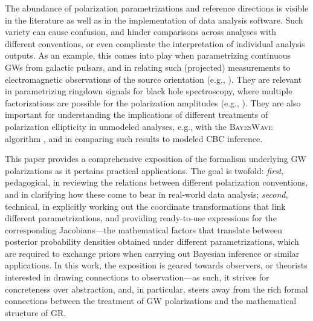 \documentclass[aps,prd,twocolumn,superscriptaddress,preprintnumbers,floatfix,nofootinbib]{revtex4-2}
\begin{document}
The abundance of polarization parametrizations and reference directions is visible in the literature as well as in the implementation of data analysis software.
Such variety can cause confusion, and hinder comparisons across analyses with different conventions, or even complicate the interpretation of individual analysis outputs.
As an example, this comes into play when parametrizing continuous GWs from galactic pulsars, and in relating such (projected) measurements to electromagnetic observations of the source orientation (e.g., \cite{Ng:2007te,Dupuis:2005xv,Isi:2017equ,Pitkin:2017qfy}).
They are relevant in parametrizing ringdown signals for black hole spectroscopy, where multiple factorizations are possible for the polarization amplitudes (e.g., \cite{Isi:2021iql,Carullo:2019flw,LIGOScientific:2020tif,LIGOScientific:2021sio}).
They are also important for understanding the implications of different treatments of polarization ellipticity in unmodeled analyses, e.g., with the \textsc{BayesWave} algorithm \cite{Cornish:2014kda,Cornish:2020dwh,Chatziioannou:2021mij}, and in comparing such results to modeled \ac{CBC} inference.

This paper provides a comprehensive exposition of the formalism underlying GW polarizations as it pertains practical applications.
The goal is twofold:
\emph{first}, pedagogical, in reviewing the relations between different polarization conventions, and in clarifying how these come to bear in real-world data analysis;
\emph{second}, technical, in explicitly working out the coordinate transformations that link different parametrizations, and providing ready-to-use expressions for the corresponding Jacobians---the mathematical factors that translate between posterior probability densities obtained under different parametrizations, which are required to exchange priors when carrying out Bayesian inference or similar applications.
In this work, the exposition is geared towards observers, or theorists interested in drawing connections to observation---as such, it strives for concreteness over abstraction, and, in particular, steers away from the rich formal connections between the treatment of GW polarizations and the mathematical structure of GR.
\end{document}
